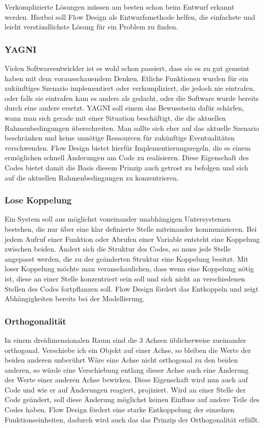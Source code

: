 Verkomplizierte Lösungen müssen am besten schon beim Entwurf erkannt werden.
Hierbei soll Flow Design als Entwurfsmethode helfen, die einfachste und leicht
verständlichste Lösung für ein Problem zu finden.

\subsubsection{YAGNI}

Vielen Softwareentwickler ist es wohl schon passiert, dass sie es zu gut gemeint
haben mit dem vorausschauendem Denken. Etliche Funktionen wurden für ein
zukünftiges Szenario implementiert oder verkompliziert, die jedoch nie
eintrafen, oder falls sie eintrafen kam es anders als gedacht, oder die Software
wurde bereits durch eine andere ersetzt.
YAGNI soll einem das Bewusstsein dafür schärfen, wann man sich gerade mit einer
Situation beschäftigt, die die aktuellen Rahmenbedingungen überschreiten.
Man sollte sich eher auf das aktuelle Szenario beschränken und keine unnötige Ressourcen für zukünftige
Eventualitäten verschwenden.
Flow Design bietet hierfür Implementierungsregeln, die es einem ermöglichen
schnell Änderungen am Code zu realisieren.
Diese Eigenschaft des Codes bietet damit die Basis diesem Prinzip auch getrost
zu befolgen und sich auf die aktuellen Rahmenbedingungen zu konzentrieren.

\subsubsection{Lose Koppelung}

Ein System soll aus möglichst voneinander unabhängigen Untersystemen bestehen,
die nur über eine  klar definierte Stelle miteinander kommunizieren.
Bei jedem Aufruf einer Funktion oder Abrufen einer Variable entsteht eine
Koppelung zwischen beiden.
Ändert sich die Struktur des Codes, so muss jede Stelle angepasst werden, die zu
der geänderten Struktur eine Koppelung besitzt. Mit loser Koppelung möchte man
veranschaulichen, dass wenn eine Koppelung nötig ist, diese an einer Stelle konzentriert sein soll und
sich nicht an verschiedenen Stellen des Codes fortpflanzen soll.
Flow Design fördert das Entkoppeln und zeigt Abhängigkeiten bereits bei der Modellierung.

\subsubsection{Orthogonalität}

In einem dreidimensionalen Raum sind die 3 Achsen üblicherweise zueinander
orthogonal. Verschiebe ich ein Objekt auf einer Achse, so bleiben die Werte der
beiden anderen unberührt Wäre eine Achse nicht orthogonal zu den beiden anderen,
so würde eine Verschiebung entlang dieser Achse auch eine Änderung der Werte
einer anderen Achse bewirken. Diese Eigenschaft wird nun auch auf Code und wie
er auf Änderungen reagiert, projiziert.
Wird an einer Stelle der Code geändert, soll diese Änderung möglichst keinen Einfluss auf
andere Teile des Codes haben. Flow Design fördert eine starke Entkoppelung der
einzelnen Funktionseinheiten, dadurch wird auch das das Prinzip der
Orthogonalität erfüllt.

